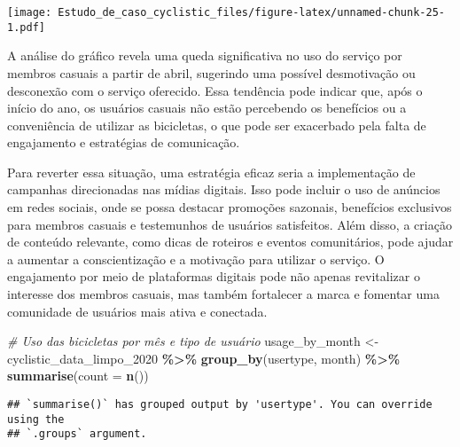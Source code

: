 \documentclass[
]{article}
\newenvironment{Shaded}{\begin{snugshade}}{\end{snugshade}}
\newcommand{\AttributeTok}[1]{\textcolor[rgb]{0.13,0.29,0.53}{#1}}
\newcommand{\CommentTok}[1]{\textcolor[rgb]{0.56,0.35,0.01}{\textit{#1}}}
\newcommand{\FunctionTok}[1]{\textcolor[rgb]{0.13,0.29,0.53}{\textbf{#1}}}
\newcommand{\NormalTok}[1]{#1}
\newcommand{\OtherTok}[1]{\textcolor[rgb]{0.56,0.35,0.01}{#1}}
\newcommand{\SpecialCharTok}[1]{\textcolor[rgb]{0.81,0.36,0.00}{\textbf{#1}}}
\begin{document}
\texttt{[image: Estudo\_de\_caso\_cyclistic\_files/figure-latex/unnamed-chunk-25-1.pdf]}

A análise do gráfico revela uma queda significativa no uso do serviço
por membros casuais a partir de abril, sugerindo uma possível
desmotivação ou desconexão com o serviço oferecido. Essa tendência pode
indicar que, após o início do ano, os usuários casuais não estão
percebendo os benefícios ou a conveniência de utilizar as bicicletas, o
que pode ser exacerbado pela falta de engajamento e estratégias de
comunicação.

Para reverter essa situação, uma estratégia eficaz seria a implementação
de campanhas direcionadas nas mídias digitais. Isso pode incluir o uso
de anúncios em redes sociais, onde se possa destacar promoções sazonais,
benefícios exclusivos para membros casuais e testemunhos de usuários
satisfeitos. Além disso, a criação de conteúdo relevante, como dicas de
roteiros e eventos comunitários, pode ajudar a aumentar a
conscientização e a motivação para utilizar o serviço. O engajamento por
meio de plataformas digitais pode não apenas revitalizar o interesse dos
membros casuais, mas também fortalecer a marca e fomentar uma comunidade
de usuários mais ativa e conectada.

\begin{Shaded}
\begin{Highlighting}[]
\CommentTok{\# Uso das bicicletas por mês e tipo de usuário}
\NormalTok{usage\_by\_month }\OtherTok{\textless{}{-}}\NormalTok{ cyclistic\_data\_limpo\_2020 }\SpecialCharTok{\%\textgreater{}\%}
  \FunctionTok{group\_by}\NormalTok{(usertype, month) }\SpecialCharTok{\%\textgreater{}\%}
  \FunctionTok{summarise}\NormalTok{(}\AttributeTok{count =} \FunctionTok{n}\NormalTok{())}
\end{Highlighting}
\end{Shaded}

\begin{verbatim}
## `summarise()` has grouped output by 'usertype'. You can override using the
## `.groups` argument.
\end{verbatim}
\end{document}
